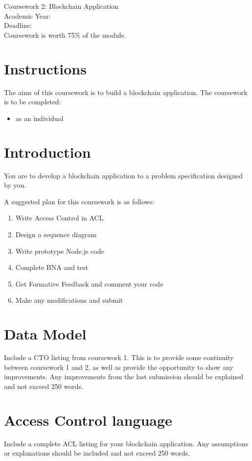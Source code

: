 \Large{\moduleCode\\
\moduleTitle\\
Coursework 2: Blockchain Application\\
Academic Year: \academicyear \\
Deadline: \cwiideadline \\
Coursework is worth 75\% of the module.}
\normalsize

\section{Instructions}
The aims of this coursework is to build a blockchain application. The coursework is to be completed:
\begin{itemize}
\item as an individual
\end{itemize}

\section{Introduction}\label{sec:intro}
You are to develop a blockchain application to a problem specification designed by you. 

A suggested plan for this coursework is as follows:
\begin{enumerate}
	\item Write Access Control in ACL
	\item Design a sequence diagram
	\item Write prototype Node.js code
	\item Complete BNA and test
	\item Get Formative Feedback and comment your code
	\item Make any modifications and submit
\end{enumerate}

\section{Data Model}\label{sec:dm}
Include a CTO listing from coursework 1. This is to provide some continuity between coursework 1 and 2, as well as provide the opportunity to show any improvements. Any improvements from the last submission should be explained and not exceed 250 words.

\section{Access Control language}\label{sec:acl}
Include a complete ACL listing for your blockchain application. 
Any assumptions or explanations should be included and not exceed 250 words.

